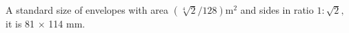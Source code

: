 A standard size of envelopes with area $ ( \sqrt[4]{2} /128 ) \mathrm{m} ^2 $ 
and sides in ratio $ 1 : \sqrt{2} , $ it is  81 \ensuremath{ \times } 114   mm.